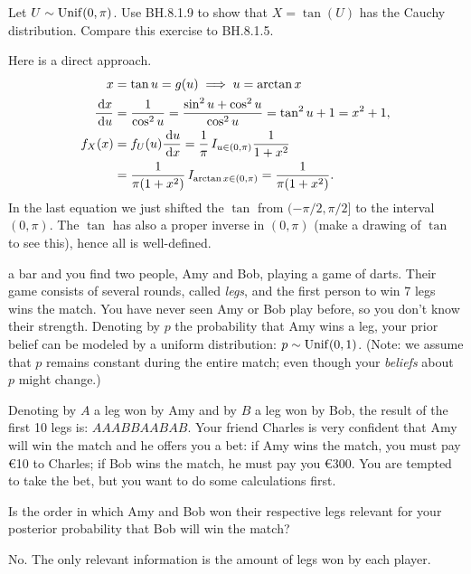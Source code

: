 \begin{exercise}
Let $U \sim  \mathrm{Unif}(0, \pi)$.
Use  BH.8.1.9 to show that $X = \tan(U)$ has the Cauchy distribution. Compare this exercise to BH.8.1.5.
\begin{solution}
Here is a direct approach.
  \begin{align}
    \label{eq:20}
x&=\tan u = g(u) \implies u = \arctan x\\
\frac{\,\textrm{d}x}{\,\textrm{d}u } &= \frac{1}{\cos^{2} u} = \frac{\sin^{2}u + \cos^{2}u }{\cos^{2}u} = \tan^{2} u + 1 = x^{2} + 1,\\
f_{X}(x) &= f_{U}(u) \frac{\,\textrm{d}u}{\,\textrm{d}x} = \frac{1}{\pi}\,I_{u\in (0, \pi)} \frac{1}{1+x^{2}} \\
&=\frac{1}{\pi(1+x^{2})}\,I_{\arctan x \in (0, \pi)} =\frac{1}{\pi(1+x^{2})}.
  \end{align}
  In the last equation we just shifted the $\tan$ from $(-\pi/2, \pi/2]$ to the interval $(0, \pi)$.
  The $\tan$ has also a proper inverse in $(0,\pi)$ (make a drawing of $\tan$ to see this), hence all is well-defined.
\end{solution}
\end{exercise}



 a bar and you find two people, Amy and Bob, playing a game of darts. Their game consists of several rounds, called \textit{legs}, and the first person to win 7 legs wins the match. You have never seen Amy or Bob play before, so you don't know their strength. Denoting by $p$ the probability that Amy wins a leg, your prior belief can be modeled by a uniform distribution: $p \sim \mathrm{Unif}(0,1)$.  (Note: we assume that $p$ remains constant during the entire match; even though your \textit{beliefs} about $p$ might change.)

Denoting by $A$ a leg won by Amy and by $B$ a leg won by Bob, the result of the first 10 legs is: $AAABBAABAB$. Your friend Charles is very confident that Amy will win the match and he offers you a bet: if Amy wins the match, you must pay €10 to Charles; if Bob wins the match, he must pay you €300. You are tempted to take the bet, but you want to do some calculations first.
\begin{exercise}
Is the order in which Amy and Bob won their respective legs relevant for your posterior probability that Bob will win the match?
\begin{solution}
No. The only relevant information is the amount of legs won by each player.
\end{solution}
\end{exercise}

